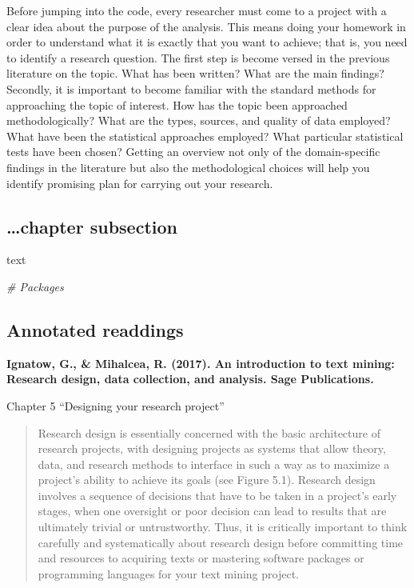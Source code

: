 \documentclass[
]{article}
\newenvironment{Shaded}{\begin{snugshade}}{\end{snugshade}}
\newcommand{\CommentTok}[1]{\textcolor[rgb]{0.56,0.35,0.01}{\textit{#1}}}
\begin{document}
Before jumping into the code, every researcher must come to a project with a clear idea about the purpose of the analysis. This means doing your homework in order to understand what it is exactly that you want to achieve; that is, you need to identify a research question. The first step is become versed in the previous literature on the topic. What has been written? What are the main findings? Secondly, it is important to become familiar with the standard methods for approaching the topic of interest. How has the topic been approached methodologically? What are the types, sources, and quality of data employed? What have been the statistical approaches employed? What particular statistical tests have been chosen? Getting an overview not only of the domain-specific findings in the literature but also the methodological choices will help you identify promising plan for carrying out your research.

\hypertarget{chapter-subsection}{%
\subsection{\ldots chapter subsection}\label{chapter-subsection}}

text

\begin{Shaded}
\begin{Highlighting}[]
\CommentTok{\# Packages}
\end{Highlighting}
\end{Shaded}

\hypertarget{annotated-readdings}{%
\subsection{Annotated readdings}\label{annotated-readdings}}

\textbf{Ignatow, G., \& Mihalcea, R. (2017). An introduction to text mining: Research design, data collection, and analysis. Sage Publications.}
\citep{Ignatow2017}

Chapter 5 ``Designing your research project''

\begin{quote}
Research design is essentially concerned with the basic architecture of research projects, with designing projects as systems that allow theory, data, and research methods to interface in such a way as to maximize a project's ability to achieve its goals (see Figure 5.1). Research design involves a sequence of decisions that have to be taken in a project's early stages, when one oversight or poor decision can lead to results that are ultimately trivial or untrustworthy. Thus, it is critically important to think carefully and systematically about research design before committing time and resources to acquiring texts or mastering software packages or programming languages for your text mining project.
\end{quote}
\end{document}
